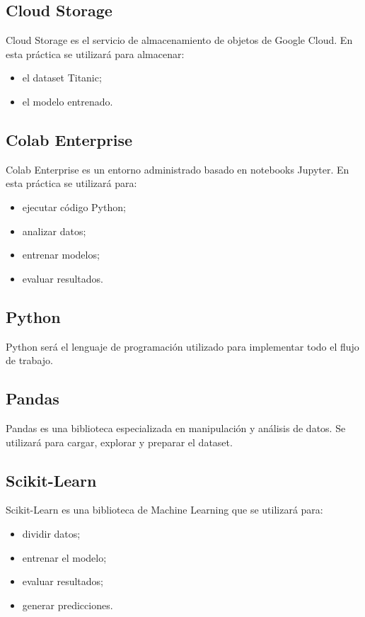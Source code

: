 \documentclass[
  coursetitle={Cómputo Nube y Tecnologías Emergentes},
  coursehours={96},
  coursedate={Verano 2026},
  doctype={Tutorial},
  otherlangs={english,french},
  authorname={Lázaro},
  authorsurname={Bustio-Martínez},
  authortitle={PhD},
  role={Profesor Investigador},
  email={lbustio@inaoe.mx},
  phone={5559504000},
  ext={7459},
  institution={Instituto Nacional de Astrofísica, Óptica y Electrónica (INAOE)},
  department={Maestría en Ciencias en Tecnologías de Seguridad},
  address={Luis Enrique Erro 1, Sta. Ma. Tonantzintla, San Andrés Cholula, CP 72840, Puebla, México},
  margin={0.5in}
]{../../lbustio_lecture_notes}
\begin{document}
\subsection{Cloud Storage}

Cloud Storage es el servicio de almacenamiento de objetos de Google Cloud. En esta práctica se utilizará para almacenar:

\begin{itemize}
    \item el dataset Titanic;
    \item el modelo entrenado.
\end{itemize}

\subsection{Colab Enterprise}

Colab Enterprise es un entorno administrado basado en notebooks Jupyter. En esta práctica se utilizará para:

\begin{itemize}
    \item ejecutar código Python;
    \item analizar datos;
    \item entrenar modelos;
    \item evaluar resultados.
\end{itemize}

\subsection{Python}

Python será el lenguaje de programación utilizado para implementar todo el flujo de trabajo.

\subsection{Pandas}

Pandas es una biblioteca especializada en manipulación y análisis de datos. Se utilizará para cargar, explorar y preparar el dataset.

\subsection{Scikit-Learn}

Scikit-Learn es una biblioteca de Machine Learning que se utilizará para:

\begin{itemize}
    \item dividir datos;
    \item entrenar el modelo;
    \item evaluar resultados;
    \item generar predicciones.
\end{itemize}
\end{document}
